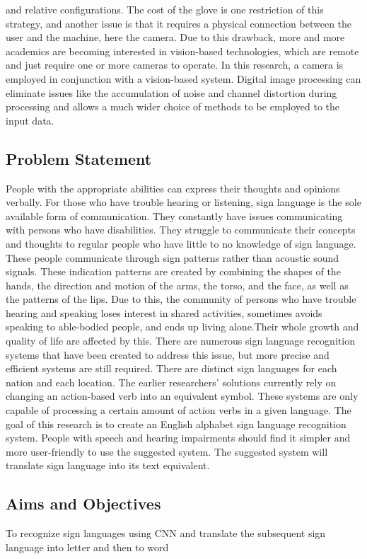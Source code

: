 \documentclass[fleqn, 11pt, twoside]{IOEGC}
\begin{document}
and relative configurations. The cost of the glove is one restriction of this strategy, and another issue is that it requires a physical connection between the user and the machine, here the camera. Due to this drawback, more and more academics are becoming interested in vision-based technologies, which are remote and just require one or more cameras to operate. In this research, a camera is employed in conjunction with a vision-based system. Digital image processing can eliminate issues like the accumulation of noise and channel distortion during processing and allows a much wider choice of methods to be employed to the input data.


\subsection{Problem Statement}
People with the appropriate abilities can express their thoughts and opinions verbally. For those who have trouble hearing or listening, sign language is the sole available form of communication. They constantly have issues communicating with persons who have disabilities. They struggle to communicate their concepts and thoughts to regular people who have little to no knowledge of sign language. These people communicate through sign patterns rather than acoustic sound signals. These indication patterns are created by combining the shapes of the hands, the direction and motion of the arms, the torso, and the face, as well as the patterns of the lips. Due to this, the community of persons who have trouble hearing and speaking loses interest in shared activities, sometimes avoids speaking to able-bodied people, and ends up living alone.Their whole growth and quality of life are affected by this. There are numerous sign language recognition systems that have been created to address this issue, but more precise and efficient systems are still required. There are distinct sign languages for each nation and each location. The earlier researchers' solutions currently rely on changing an action-based verb into an equivalent symbol. These systems are only capable of processing a certain amount of action verbs in a given language. The goal of this research is to create an English alphabet sign language recognition system. People with speech and hearing impairments should find it simpler and more user-friendly to use the suggested system. The suggested system will translate sign language into its text equivalent.

\subsection{Aims and Objectives}
To recognize sign languages using CNN and translate the subsequent sign language into letter and then to word
\end{document}
